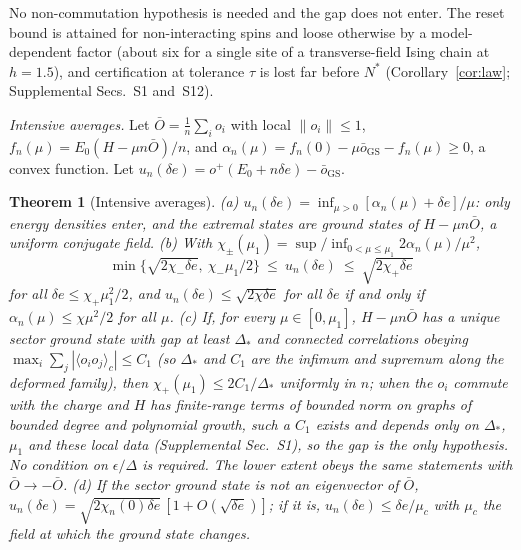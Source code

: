 \documentclass[aps,prx,twocolumn,10pt,superscriptaddress,nofootinbib,longbibliography,floatfix]{revtex4-2}
\newtheorem{theorem}{Theorem}
\theoremstyle{remark}
\newcommand{\de}{\delta e}
\newcommand{\GS}{\mathrm{GS}}
\begin{document}
No non-commutation hypothesis is needed and the gap does not enter. The reset bound is attained for non-interacting
spins and loose otherwise by a model-dependent factor (about six for a single site of a transverse-field Ising %
chain at $h=1.5$), and certification at tolerance $\tau$ is lost far before $N^*$ %
(Corollary~\ref{cor:law}; Supplemental Secs.~S1 and~S12). %

\emph{Intensive averages.} Let $\bar O=\frac1n\sum_io_i$ with local $\|o_i\|\le1$, $f_n(\mu)=E_0(H-\mu n\bar O)/n$, and
$\alpha_n(\mu)=f_n(0)-\mu\bar o_\GS-f_n(\mu)\ge0$, a convex function. Let $u_n(\de)=o^+(E_0+n\de)-\bar o_\GS$.

\begin{theorem}[Intensive averages]
\label{thm:avg}
(a) $u_n(\de)=\inf_{\mu>0}[\alpha_n(\mu)+\de]/\mu$: only energy densities enter, and the extremal states are ground
states of $H-\mu n\bar O$, a uniform conjugate field.
(b) With $\chi_\pm(\mu_1)=\sup/\inf_{0<\mu\le\mu_1}2\alpha_n(\mu)/\mu^2$,
\begin{equation}
\min\{\sqrt{2\chi_-\de},\ \chi_-\mu_1/2\}\ \le\ u_n(\de)\ \le\ \sqrt{2\chi_+\de} %
\label{eq:sandwich}
\end{equation}
for all $\de\le\chi_+\mu_1^2/2$, and $u_n(\de)\le\sqrt{2\chi\de}$ for all $\de$ if and only if $\alpha_n(\mu)\le\chi\mu^2/2$
for all $\mu$.
(c) If, for every $\mu\in[0,\mu_1]$, $H-\mu n\bar O$ has a unique sector ground state with gap at least $\Delta_*$ and
connected correlations obeying $\max_i\sum_j|\langle o_io_j\rangle_c|\le C_1$ (so $\Delta_*$ and $C_1$ are the
infimum and supremum along the deformed family), then $\chi_+(\mu_1)\le2C_1/\Delta_*$ uniformly in $n$; when the
$o_i$ commute with the charge and $H$ has finite-range terms of bounded norm on graphs of bounded degree and
polynomial growth, such a $C_1$ exists and depends only on $\Delta_*$, $\mu_1$ and these local data (Supplemental
Sec.~S1), so the gap is the only hypothesis. No condition
on $\epsilon/\Delta$ is required. The lower extent obeys the same statements with $\bar O\to-\bar O$.
(d) If the sector ground state is not an eigenvector of $\bar O$, $u_n(\de)=\sqrt{2\chi_n(0)\de}\,[1+O(\sqrt{\de})]$; if it
is, $u_n(\de)\le\de/\mu_c$ with $\mu_c$ the field at which the ground state changes.
\end{theorem}
\end{document}
